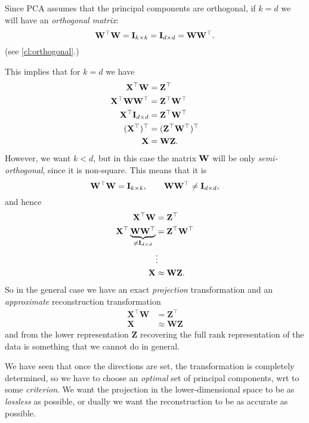 Since PCA assumes that the principal components are orthogonal, if $k = d$ we will have an \emph{orthogonal matrix}:
\begin{equation}
    \vb{W}^{\top} \vb{W} = \vb{I}_{k \times k} = \vb{I}_{d \times d} = \vb{W} \vb{W}^{\top}.
\end{equation}
(see \cref{cl:orthogonal}.)

This implies that for $k = d$ we have
\begin{align}
    \vb{X}^{\top} \vb{W} &= \vb{Z}^{\top} \\
    \vb{X}^{\top} \vb{W} \vb{W}^{\top} &= \vb{Z}^{\top} \vb{W}^{\top} \\
    \vb{X}^{\top} \vb{I}_{d \times d} &= \vb{Z}^{\top} \vb{W}^{\top} \\
    (\vb{X}^{\top})^{\top} &= (\vb{Z}^{\top} \vb{W}^{\top})^{\top} \\
    \vb{X} &= \vb{W} \vb{Z}.
\end{align}
However, we want $k < d$, but in this case the matrix $\vb{W}$ will be only \emph{semi-orthogonal}, since it is non-square. This means that it is 
\begin{equation}
    \vb{W}^{\top} \vb{W} = \vb{I}_{k \times k}, \qquad \vb{W} \vb{W}^{\top} \neq \vb{I}_{d \times d},
\end{equation}
and hence
\begin{equation}
    \begin{aligned}
        \vb{X}^{\top} \vb{W} & = \vb{Z}^{\top} \\
        \vb{X}^{\top} \underbrace{\vb{W} \vb{W}^{\top}}_{\neq \vb{I}_{d \times d}} & = \vb{Z}^{\top} \vb{W}^{\top} \\
        & \vdots \\
        \vb{X} & \approx \vb{W} \vb{Z}.
    \end{aligned}
\end{equation}
So in the general case we have an exact \emph{projection} transformation and an \emph{approximate} reconstruction transformation
\begin{align}
	\mathbf{X}^\top \mathbf{W} &= \mathbf{Z}^\top \label{eq:projection}\\
	\mathbf{X} &\approx \mathbf{W}\mathbf{Z} \label{eq:reconstruction}
\end{align}
and from the lower representation $\mathbf{Z}$ recovering the full rank representation of the data is something that we cannot do in general. 

We have seen that once the directions are set, the transformation is completely determined, so we have to choose an \emph{optimal} set of principal components, wrt to some \emph{criterion}. We want the projection in the lower-dimensional space to be as \emph{lossless} as possible, or dually we want the reconstruction to be as accurate as possible.

